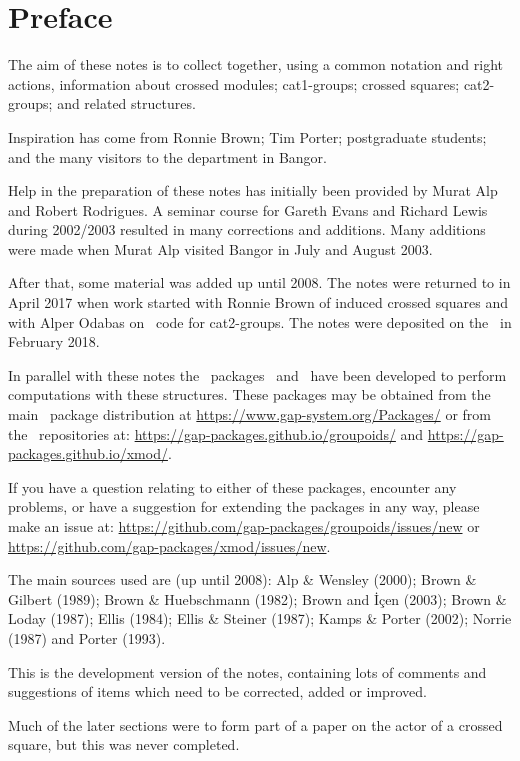 
\section*{Preface}


The aim of these notes is to collect together, using a common notation
and right actions, information about crossed modules; cat1-groups;
crossed squares; cat2-groups; and related structures.

Inspiration has come from Ronnie Brown; Tim Porter; postgraduate students;
and the many visitors to the department in Bangor.

Help in the preparation of these notes has initially been 
provided by Murat Alp and Robert Rodrigues.
A seminar course for Gareth Evans and Richard Lewis during 2002/2003 
resulted in many corrections and additions.
Many additions were made when Murat Alp visited Bangor in July and August 2003.

After that, some material was added up until 2008. 
The notes were returned to in April 2017 when work started with Ronnie Brown 
of induced crossed squares and with Alper Odabas on \GAP\ code for cat2-groups. 
The notes were deposited on the \arXiv\ in February 2018. 

In parallel with these notes the \GAP\ packages \XMod\ and \Groupoids\ 
have been developed to perform computations with these structures. 
These packages may be obtained from the main \GAP\ package distribution at
\url{https://www.gap-system.org/Packages/} 
or from the \GitHub\ repositories at:
\url{https://gap-packages.github.io/groupoids/} and
\url{https://gap-packages.github.io/xmod/}. 

If you have a question relating to either of these packages, encounter any problems, 
or have a suggestion for extending the packages in any way, please 
make an issue at: \url{https://github.com/gap-packages/groupoids/issues/new} 
or \url{https://github.com/gap-packages/xmod/issues/new}. 

\bigskip
The main sources used are (up until 2008): 
Alp \& Wensley \cite{alp:wens-ijac} (2000); 
Brown \& Gilbert \cite{brow:gilb} (1989); 
Brown \& Huebschmann \cite{brow:hueb} (1982); 
Brown and \.{I}\c{c}en \cite{brow:icen} (2003); 
Brown \& Loday \cite{brow:lod} (1987); 
Ellis \cite{ellis-thesis} (1984); 
Ellis \& Steiner \cite{ell:st} (1987); 
Kamps \& Porter \cite{kamps:port} (2002); 
Norrie \cite{norrie-thesis} (1987) and 
Porter \cite{porter:top} (1993).

\bigskip

This is the development version of the notes, containing lots of
comments and suggestions of items which need to be corrected, added
or improved.

Much of the later sections were to form part of a paper 
on the actor of a crossed square, but this was never completed. 
